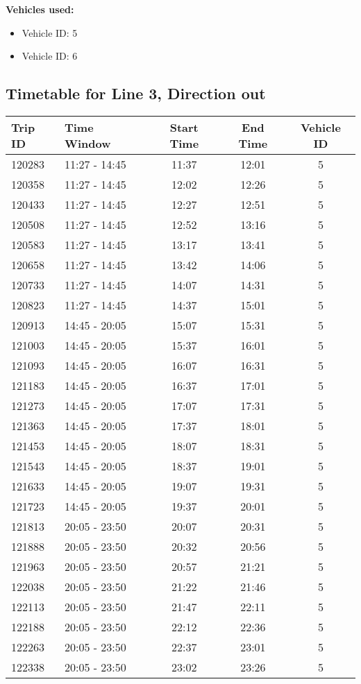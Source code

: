 \documentclass{article}
\begin{document}
\textbf{Vehicles used:}
\begin{itemize}
  \item Vehicle ID: 5
  \item Vehicle ID: 6
\end{itemize}

\subsection*{Timetable for Line 3, Direction out}
\begin{tabular}{llccc}
\toprule
Trip ID & Time Window & Start Time & End Time & Vehicle ID \\
\midrule
120283 & 11:27 - 14:45 & 11:37 & 12:01 & 5 \\
120358 & 11:27 - 14:45 & 12:02 & 12:26 & 5 \\
120433 & 11:27 - 14:45 & 12:27 & 12:51 & 5 \\
120508 & 11:27 - 14:45 & 12:52 & 13:16 & 5 \\
120583 & 11:27 - 14:45 & 13:17 & 13:41 & 5 \\
120658 & 11:27 - 14:45 & 13:42 & 14:06 & 5 \\
120733 & 11:27 - 14:45 & 14:07 & 14:31 & 5 \\
120823 & 11:27 - 14:45 & 14:37 & 15:01 & 5 \\
120913 & 14:45 - 20:05 & 15:07 & 15:31 & 5 \\
121003 & 14:45 - 20:05 & 15:37 & 16:01 & 5 \\
121093 & 14:45 - 20:05 & 16:07 & 16:31 & 5 \\
121183 & 14:45 - 20:05 & 16:37 & 17:01 & 5 \\
121273 & 14:45 - 20:05 & 17:07 & 17:31 & 5 \\
121363 & 14:45 - 20:05 & 17:37 & 18:01 & 5 \\
121453 & 14:45 - 20:05 & 18:07 & 18:31 & 5 \\
121543 & 14:45 - 20:05 & 18:37 & 19:01 & 5 \\
121633 & 14:45 - 20:05 & 19:07 & 19:31 & 5 \\
121723 & 14:45 - 20:05 & 19:37 & 20:01 & 5 \\
121813 & 20:05 - 23:50 & 20:07 & 20:31 & 5 \\
121888 & 20:05 - 23:50 & 20:32 & 20:56 & 5 \\
121963 & 20:05 - 23:50 & 20:57 & 21:21 & 5 \\
122038 & 20:05 - 23:50 & 21:22 & 21:46 & 5 \\
122113 & 20:05 - 23:50 & 21:47 & 22:11 & 5 \\
122188 & 20:05 - 23:50 & 22:12 & 22:36 & 5 \\
122263 & 20:05 - 23:50 & 22:37 & 23:01 & 5 \\
122338 & 20:05 - 23:50 & 23:02 & 23:26 & 5 \\
\bottomrule
\end{tabular}
\end{document}
